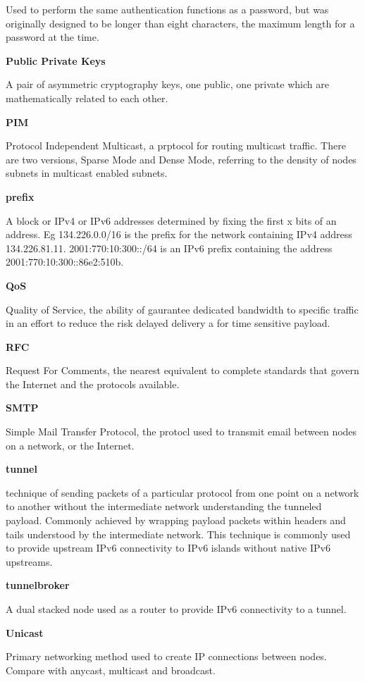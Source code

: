 Used to perform the same authentication functions as a password, but was
originally designed to be longer than eight characters, the maximum
length for a password at the time.

\textbf{Public Private Keys}

A pair of asymmetric cryptography keys, one public, one private which 
are mathematically related to each other. 

\textbf{PIM}

Protocol Independent Multicast, a prptocol for routing multicast
traffic. There are two versions, Sparse Mode and Dense Mode, referring
to the density of nodes subnets in multicast enabled subnets.

\textbf{prefix}

A block or IPv4 or IPv6 addresses determined by fixing the first x bits
of an address. Eg 134.226.0.0/16 is the prefix for the network
containing IPv4 address 134.226.81.11. 2001:770:10:300::/64 is an IPv6
prefix containing the address 2001:770:10:300::86e2:510b. 

\textbf{QoS}

Quality of Service, the ability of gaurantee dedicated bandwidth to
specific traffic in an effort to reduce the risk delayed delivery a for
time sensitive payload.

\textbf{RFC}

Request For Comments, the nearest equivalent to complete standards that
govern the Internet and the protocols available.

\textbf{SMTP}

Simple Mail Transfer Protocol, the protocl used to transmit email
between nodes on a network, or the Internet.

\textbf{tunnel}

technique of sending packets of a particular protocol from one point on
a network to another without the intermediate network understanding the
tunneled payload. Commonly achieved by wrapping payload packets within
headers and tails understood by the intermediate network. This
technique is commonly used to provide upstream IPv6 connectivity to IPv6
islands without native IPv6 upstreams.

\textbf{tunnelbroker}

A dual stacked node used as a router to provide IPv6 connectivity to a
tunnel.

\textbf{Unicast}

Primary networking method used to create IP connections between nodes.
Compare with anycast, multicast and broadcast.

